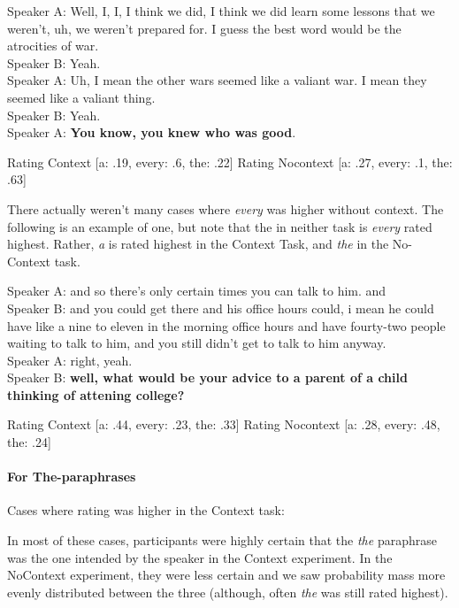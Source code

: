 \documentclass[12pt,letterpaper,table,svgnames,dvipsnames]{article}
\begin{document}
\begin{exe}
    \ex {}
    Speaker A: Well, I, I, I think we did, I think we did learn some lessons that we weren't, uh, we weren't prepared for. I guess the best word would be the atrocities of war.\\
    Speaker B: Yeah.\\
    Speaker A: Uh, I mean the other wars seemed like a valiant war. I mean they seemed like a valiant thing.\\
    Speaker B: Yeah.\\
    Speaker A: \textbf{You know, you knew who was good}.
\end{exe}
Rating Context [a: .19, every: .6, the: .22]
Rating Nocontext [a: .27, every: .1, the: .63]


There actually weren't many cases where \emph{every} was higher without context. The following is an example of one, but note that the in neither task is \emph{every} rated highest. Rather, \emph{a} is rated highest in the Context Task, and \emph{the} in the No-Context task.
\begin{exe}
    \ex {}
    Speaker A: and so there's only certain times you can talk to him. and\\
    Speaker B: and you could get there and his office hours could, i mean he could have like a nine to eleven in the morning office hours and have fourty-two people waiting to talk to him, and you still didn't get to talk to him anyway.\\
    Speaker A: right, yeah.\\
    Speaker B: \textbf{well, what would be your advice to a parent of a child thinking of attening college?}
\end{exe}
Rating Context [a: .44, every: .23, the: .33]
Rating Nocontext [a: .28, every: .48, the: .24]



\paragraph{For The-paraphrases}

Cases where rating was higher in the Context task:

In most of these cases, participants were highly certain that the \emph{the} paraphrase was the one intended by the speaker in the Context experiment. In the NoContext experiment, they were less certain and we saw probability mass more evenly distributed between the three (although, often \emph{the} was still rated highest).
\end{document}
